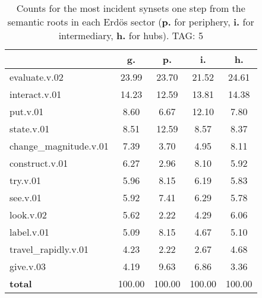\begin{table}[h!]
\begin{center}
\begin{tabular}{| l | c | c | c | c |}\hline
 & g. & p. & i. & h. \\\hline
evaluate.v.02 & 23.99  & 23.70  & 21.52  & 24.61 \\\hline
interact.v.01 & 14.23  & 12.59  & 13.81  & 14.38 \\\hline
put.v.01 & 8.60  & 6.67  & 12.10  & 7.80 \\\hline
state.v.01 & 8.51  & 12.59  & 8.57  & 8.37 \\\hline
change\_magnitude.v.01 & 7.39  & 3.70  & 4.95  & 8.11 \\\hline
construct.v.01 & 6.27  & 2.96  & 8.10  & 5.92 \\\hline
try.v.01 & 5.96  & 8.15  & 6.19  & 5.83 \\\hline
see.v.01 & 5.92  & 7.41  & 6.29  & 5.78 \\\hline
look.v.02 & 5.62  & 2.22  & 4.29  & 6.06 \\\hline
label.v.01 & 5.09  & 8.15  & 4.67  & 5.10 \\\hline
travel\_rapidly.v.01 & 4.23  & 2.22  & 2.67  & 4.68 \\\hline
give.v.03 & 4.19  & 9.63  & 6.86  & 3.36 \\\hline
{{\bf total}} & 100.00  & 100.00  & 100.00  & 100.00 \\\hline
\end{tabular}
\caption{Counts for the most incident synsets one step from the semantic roots in each Erd\"os sector ({\bf p.} for periphery, {\bf i.} for intermediary, {\bf h.} for hubs). TAG: 5}
\end{center}
\end{table}